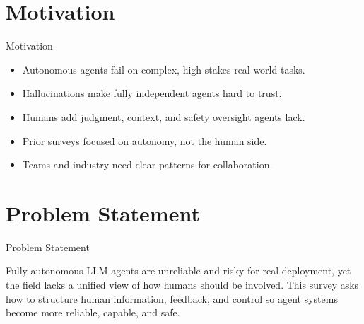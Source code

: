 \documentclass[10pt]{beamer}
\begin{document}
\section{Motivation}
\begin{frame}{Motivation}
\begin{itemize}
  \item Autonomous agents fail on complex, high-stakes real-world tasks.
  \item Hallucinations make fully independent agents hard to trust.
  \item Humans add judgment, context, and safety oversight agents lack.
  \item Prior surveys focused on autonomy, not the human side.
  \item Teams and industry need clear patterns for collaboration.
\end{itemize}
\end{frame}
\section{Problem Statement}
\begin{frame}{Problem Statement}
  \begin{block}{}
  Fully autonomous LLM agents are unreliable and risky for real deployment, yet the field lacks a unified view of how humans should be involved. This survey asks how to structure human information, feedback, and control so agent systems become more reliable, capable, and safe.
  \end{block}
\end{frame}
\end{document}
